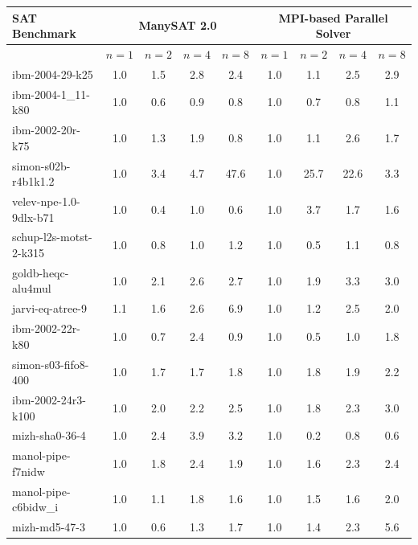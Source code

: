 \documentclass[letterpaper, compsoc, conference]{IEEEtran}
\begin{document}
\begin{table}[htbp]
    \begin{center}
    \begin{tabular}{|l|c|c|c|c|c|c|c|c|}
        \hline
        {\textbf{SAT Benchmark}} & \multicolumn{4}{c|}{\bf ManySAT 2.0} & \multicolumn{4}{c|}{\bf MPI-based Parallel Solver} \\
        \hline
        & $n=1$ & $n=2$ & $n=4$ & $n=8$ & $n=1$ & $n=2$ & $n=4$ & $n=8$ \\
        \hline
        ibm-2004-29-k25                    &       1.0 &  1.5 &  2.8 &  2.4 &  1.0 &  1.1 &  2.5 &  2.9 \\
        ibm-2004-1\_11-k80                 &       1.0 &  0.6 &  0.9 &  0.8 &  1.0 &  0.7 &  0.8 &  1.1 \\
        ibm-2002-20r-k75                   &       1.0 &  1.3 &  1.9 &  0.8 &  1.0 &  1.1 &  2.6 &  1.7 \\
        simon-s02b-r4b1k1.2                &       1.0 &  3.4 &  4.7 & 47.6 &  1.0 & 25.7 & 22.6 &  3.3 \\
        velev-npe-1.0-9dlx-b71             &       1.0 &  0.4 &  1.0 &  0.6 &  1.0 &  3.7 &  1.7 &  1.6 \\
        schup-l2s-motst-2-k315             &       1.0 &  0.8 &  1.0 &  1.2 &  1.0 &  0.5 &  1.1 &  0.8 \\
        goldb-heqc-alu4mul                 &       1.0 &  2.1 &  2.6 &  2.7 &  1.0 &  1.9 &  3.3 &  3.0 \\
        jarvi-eq-atree-9                   &       1.1 &  1.6 &  2.6 &  6.9 &  1.0 &  1.2 &  2.5 &  2.0 \\
        ibm-2002-22r-k80                   &       1.0 &  0.7 &  2.4 &  0.9 &  1.0 &  0.5 &  1.0 &  1.8 \\
        simon-s03-fifo8-400                &       1.0 &  1.7 &  1.7 &  1.8 &  1.0 &  1.8 &  1.9 &  2.2 \\
        ibm-2002-24r3-k100                 &       1.0 &  2.0 &  2.2 &  2.5 &  1.0 &  1.8 &  2.3 &  3.0 \\
        mizh-sha0-36-4                     &       1.0 &  2.4 &  3.9 &  3.2 &  1.0 &  0.2 &  0.8 &  0.6 \\
        manol-pipe-f7nidw                  &       1.0 &  1.8 &  2.4 &  1.9 &  1.0 &  1.6 &  2.3 &  2.4 \\
        manol-pipe-c6bidw\_i               &       1.0 &  1.1 &  1.8 &  1.6 &  1.0 &  1.5 &  1.6 &  2.0 \\
        mizh-md5-47-3                      &       1.0 &  0.6 &  1.3 &  1.7 &  1.0 &  1.4 &  2.3 &  5.6 \\

\end{tabular}
\end{center}
\end{table}
\end{document}
